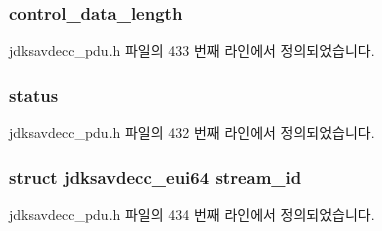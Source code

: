 \subsubsection[{\texorpdfstring{control\+\_\+data\+\_\+length}{control_data_length}}]{ control\+\_\+data\+\_\+length}\hypertarget{structjdksavdecc__common__control__header_ae87a102016a7b6abd96bba5df2ae3768}{}\label{structjdksavdecc__common__control__header_ae87a102016a7b6abd96bba5df2ae3768}


jdksavdecc\+\_\+pdu.\+h 파일의 433 번째 라인에서 정의되었습니다.

\subsubsection[{\texorpdfstring{status}{status}}]{ status}\hypertarget{structjdksavdecc__common__control__header_ade20423e91627f07e610924cb0081623}{}\label{structjdksavdecc__common__control__header_ade20423e91627f07e610924cb0081623}


jdksavdecc\+\_\+pdu.\+h 파일의 432 번째 라인에서 정의되었습니다.

\subsubsection[{\texorpdfstring{stream\+\_\+id}{stream_id}}]{\setlength{\rightskip}{0pt plus 5cm}struct {\bf jdksavdecc\+\_\+eui64} stream\+\_\+id}\hypertarget{structjdksavdecc__common__control__header_af4c017686a11885d1d514c21bcde8160}{}\label{structjdksavdecc__common__control__header_af4c017686a11885d1d514c21bcde8160}


jdksavdecc\+\_\+pdu.\+h 파일의 434 번째 라인에서 정의되었습니다.

